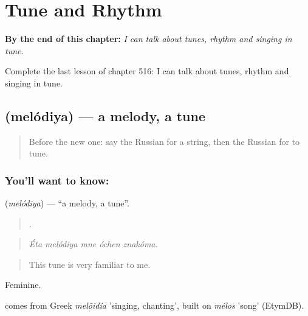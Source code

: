 
\chapter{Tune and Rhythm}
\label{ch:ru-tune-and-rhythm}

\begin{chapteropening}
\textbf{By the end of this chapter:} \emph{I can talk about tunes, rhythm and singing in tune.}

Complete the last lesson of chapter 516: I can talk about tunes, rhythm and singing in tune.
\end{chapteropening}

\section[\texorpdfstring{\ru{мелодия} (melódiya)}{мелодия (melódiya)}]{ (melódiya) — a melody, a tune}

\label{lesson:RU-C516-melodiya}



\begin{quote}
Before the new one: say the Russian for a string, then the Russian for to tune.
\end{quote}

\subsection*{You'll want to know: }
\textbf{} (\emph{melódiya}) — \textquotedblleft{}a melody, a tune\textquotedblright{}.

\begin{quote}
    .
\end{quote}

\begin{quote}
\emph{Éta melódiya mne óchen znakóma.}
\end{quote}

\begin{quote}
This tune is very familiar to me.
\end{quote}

Feminine.

\begin{cousinweb}
\emph{} comes from Greek \emph{melōidía} 'singing, chanting', built on \emph{mélos} 'song' (EtymDB).
\end{cousinweb}

